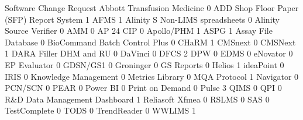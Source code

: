 \documentclass{article}
\begin{document}
\begin{Schunk}
\begin{Soutput}
                                           Software Change Request
  Abbott Transfusion Medicine                                    0
  ADD Shop Floor Paper (SFP) Report System                       1
  AFMS                                                           1
  Alinity S Non-LIMS spreadsheets                                0
  Alinity Source Verifier                                        0
  AMM                                                            0
  AP 24 CIP                                                      0
  Apollo/PHM                                                     1
  ASPG                                                           1
  Assay File Database                                            0
  BioCommand Batch Control Plus                                  0
  CHaRM                                                          1
  CMSnext                                                        0
  CMSNext                                                        1
  DARA Filler DHM and RU                                         0
  DaVinci                                                        0
  DFCS                                                           2
  DPW                                                            0
  EDMS                                                           0
  eNovator                                                       0
  EP Evaluator                                                   0
  GDSN/GS1                                                       0
  Groninger                                                      0
  GS Reports                                                     0
  Helios                                                         1
  ideaPoint                                                      0
  IRIS                                                           0
  Knowledge Management                                           0
  Metrics Library                                                0
  MQA Protocol                                                   1
  Navigator                                                      0
  PCN/SCN                                                        0
  PEAR                                                           0
  Power BI                                                       0
  Print on Demand                                                0
  Pulse                                                          3
  QIMS                                                           0
  QPI                                                            0
  R&D Data Management Dashboard                                  1
  Reliasoft Xfmea                                                0
  RSLMS                                                          0
  SAS                                                            0
  TestComplete                                                   0
  TODS                                                           0
  TrendReader                                                    0
  WWLIMS                                                         1
                                          

\end{Soutput}
\end{Schunk}
\end{document}
